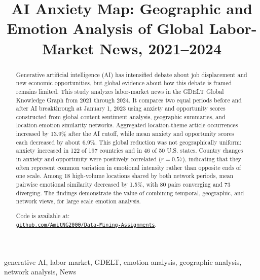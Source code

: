 \documentclass[conference]{IEEEtran}
\begin{document}
\title{AI Anxiety Map: Geographic and Emotion Analysis of Global Labor-Market News, 2021–2024}

\author{
}

\maketitle

\begin{abstract}
Generative artificial intelligence (AI) has intensified debate about job
displacement and new economic opportunities, but global evidence about how
this debate is framed remains limited. This study analyzes labor-market news
in the GDELT Global Knowledge Graph \cite{leetaru2013gdelt} from 2021 through 2024. It compares two
equal periods before and after AI breakthrough at January 1, 2023 using anxiety and opportunity scores
constructed from global content sentiment analysis, geographic summaries, and
location-emotion similarity networks. Aggregated location-theme article
occurrences increased by 13.9\% after the AI cutoff, while mean anxiety and
opportunity scores each decreased by about 6.9\%. This global reduction was
not geographically uniform: anxiety increased in 122 of 197 countries 
and in 46 of 50 U.S. states. Country changes in anxiety and
opportunity were positively correlated ($r=0.57$), indicating that they often
represent common variation in emotional intensity rather than opposite ends
of one scale. Among 18 high-volume locations shared by both network periods,
mean pairwise emotional similarity decreased by 1.5\%, with 80 pairs
converging and 73 diverging. The findings demonstrate the value of combining
temporal, geographic, and network views, for large scale emotion analysis.

Code is available at:\\ 
\href{https://github.com/AmitNG2000/Data-Mining-Assignments} {\texttt{github.com/AmitNG2000/Data-Mining-Assignments}}.
\end{abstract}

\begin{IEEEkeywords}
generative AI, labor market, GDELT, emotion analysis, geographic analysis,
network analysis, News
\end{IEEEkeywords}
\end{document}
